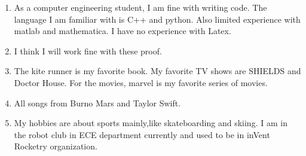 \documentclass{article}
\begin{document}
\begin{enumerate}
\item As a computer engineering student, I am fine with writing code. The language I am familiar with is C++ and python. Also limited experience with matlab and mathematica. I have no experience with Latex. 

\item I think I will work fine with these proof.

\item The kite runner is my favorite book. My favorite TV shows are SHIELDS and Doctor House. For the movies, marvel is my favorite series of movies.

\item All songs from Burno Mars and Taylor Swift.

\item My hobbies are about sports mainly,like skateboarding and skiing. I am in the robot club in ECE department currently and used to be in inVent Rocketry organization.   

\end{enumerate}
\end{document}
